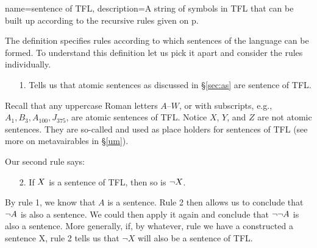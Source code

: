	
{
name=sentence of TFL,
description={A string of symbols in TFL that can be built up according to the recursive rules given on p.~\pageref{TFLsentences}}
}

The definition specifies rules according to which sentences of the language can be formed. To understand this definition let us pick it apart and consider the rules individually.



\begin{enumerate}
\item[1.] Tells us that atomic sentences as discussed in \S\ref{sec:as} are sentence of TFL.
\end{enumerate}
Recall that any uppercase Roman letters $A$--$W$, or with subscripts, e.g., $A_1, B_3, A_{100}, J_{375}$, are atomic sentences of TFL. Notice $X$, $Y$, and $Z$ are not atomic sentences. They are so-called  and used as place holders for sentences of TFL (see more on metavairables in \S\ref{um}).



Our second rule says:
\begin{enumerate}
\item[2.]
If $X$ is a sentence of TFL, then so is $\neg X$.
\end{enumerate}
By rule 1, we know that $A$ is a sentence. Rule 2 then allows us to conclude that $\neg A$ is also a sentence. We could then apply it again and conclude that $\neg\neg A$ is also a sentence. More generally, if, by whatever, rule we have a constructed a sentence X, rule 2 tells us that $\neg X$ will also be a sentence of TFL. 

